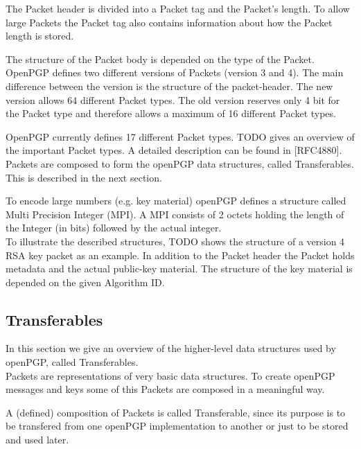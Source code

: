 The Packet header is divided into a Packet tag and the Packet's length. To allow large Packets the Packet tag also contains information about how the Packet length is stored. 

The structure of the Packet body is depended on the type of the Packet. \\


OpenPGP defines two different versions of Packets (version 3 and 4). The main difference between the version is the structure of the packet-header. The new version allows 64 different Packet types. The old version reserves only 4 bit for the Packet type and therefore allows a maximum of 16 different Packet types.

OpenPGP currently defines 17 different Packet types. TODO gives an overview of the important Packet types. A detailed description can be found in [RFC4880]. \\ 

Packets are composed to form the openPGP data structures, called Transferables. This is described in the next section.



To encode large numbers (e.g. key material) openPGP defines a structure called Multi Precision Integer (MPI). A MPI consists of 2 octets holding the length of the Integer (in bits) followed by the actual integer. \\


To illustrate the described structures, TODO shows the structure of a version 4 RSA key packet as an example. In addition to the Packet header the Packet holds metadata and the actual public-key material. The structure of the key material is depended on the given Algorithm ID.



\subsection{Transferables}

In this section we give an overview of the higher-level data structures used by openPGP, called Transferables.  \\

Packets are representations of very basic data structures. To create openPGP messages and keys some of this Packets are composed in a meaningful way.

A (defined) composition of Packets is called Transferable, since its purpose is to be transfered from one openPGP implementation to another or just to be stored and used later. \\

